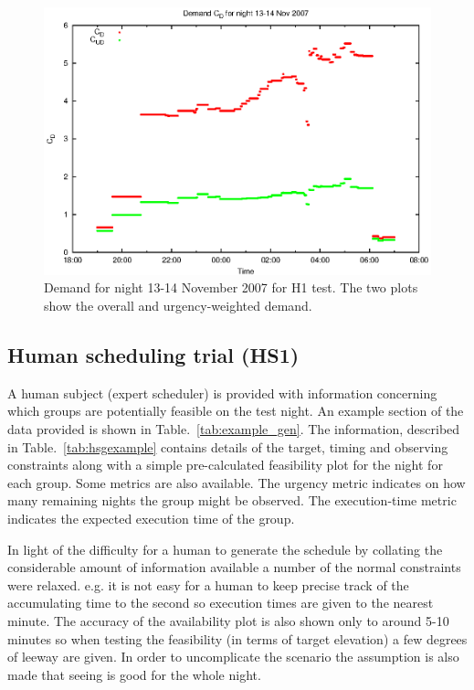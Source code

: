 \begin{figure}[htbp]
\begin{center}
    \includegraphics[scale=1.0, angle=0]{figures/mam/dmd.eps}
\end{center}
\caption[Demand for night 13-14 November 2007.]
{Demand for night 13-14 November 2007 for H1 test. The two plots show the overall and urgency-weighted demand.}
\label{fig:mam_h1_dmd}
\end{figure}


\subsection{Human scheduling trial (HS1)}
A human subject (expert scheduler) is provided with information concerning which groups are potentially feasible on the test night. An example section of the data provided is shown in Table.~\ref{tab:example_gen}. The information, described in Table.~\ref{tab:hsgexample} contains details of the target, timing and observing constraints along with a simple pre-calculated feasibility plot for the night for each group. Some metrics are also available. The urgency metric indicates on how many remaining nights the group might be observed. The execution-time metric indicates the expected execution time of the group. 

In light of the difficulty for a human to generate the schedule by collating the considerable amount of information available a number of the normal constraints were relaxed. e.g. it is not easy for a human to keep precise track of the accumulating time to the second so execution times are given to the nearest minute. The accuracy of the availability plot is also shown only to around 5-10 minutes so when testing the feasibility (in terms of target elevation) a few degrees of leeway are given. In order to uncomplicate the scenario the assumption is also made that seeing is good for the whole night. 

